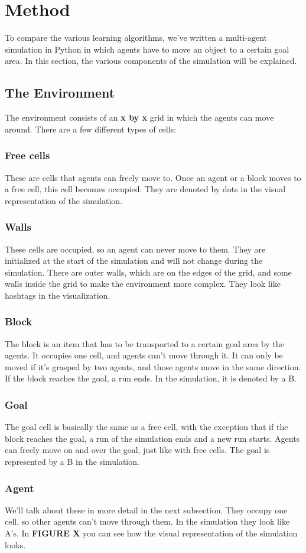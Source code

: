 \section{Method}
To compare the various learning algorithms, we've written a multi-agent simulation in Python in which agents have to move an object to a certain goal area. In this section, the various components of the simulation will be explained.
\subsection{The Environment}
The environment consists of an \textbf{x by x} grid in which the agents can move around. There are a few different types of cells:
\subsubsection*{Free cells}
These are cells that agents can freely move to. Once an agent or a block moves to a free cell, this cell becomes occupied. They are denoted by dots in the visual representation of the simulation.
\subsubsection*{Walls}
These cells are occupied, so an agent can never move to them. They are initialized at the start of the simulation and will not change during the simulation. There are outer walls, which are on the edges of the grid, and some walls inside the grid to make the environment more complex. They look like hashtags in the visualization.
\subsubsection*{Block}
The block is an item that has to be transported to a certain goal area by the agents. It occupies one cell, and agents can't move through it. It can only be moved if it's grasped by two agents, and those agents move in the same direction. If the block reaches the goal, a run ends. In the simulation, it is denoted by a B.
\subsubsection*{Goal}
The goal cell is basically the same as a free cell, with the exception that if the block reaches the goal, a run of the simulation ends and a new run starts. Agents can freely move on and over the goal, just like with free cells. The goal is represented by a B in the simulation.
\subsubsection*{Agent}
We'll talk about these in more detail in the next subsection. They occupy one cell, so other agents can't move through them. In the simulation they look like A's.\n\n
In \textbf{FIGURE X} you can see how the visual representation of the simulation looks.
